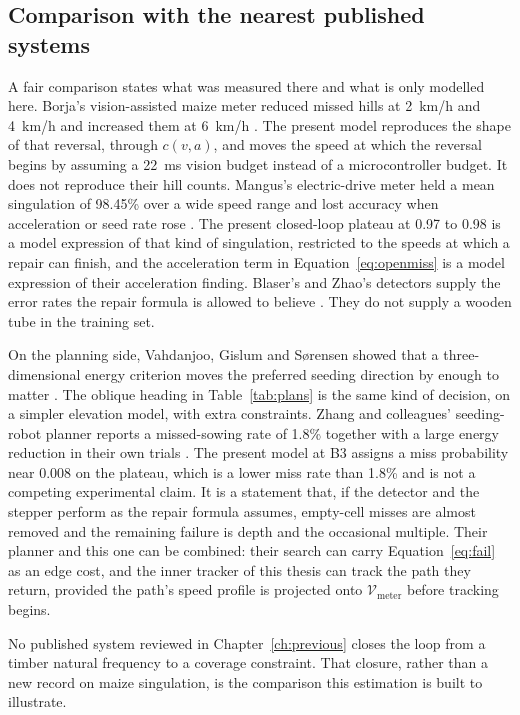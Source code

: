 \subsection{Comparison with the nearest published systems}

A fair comparison states what was measured there and what is only modelled here. Borja's vision-assisted maize meter reduced missed hills at \SI{2}{km/h} and \SI{4}{km/h} and increased them at \SI{6}{km/h} \cite{borja2021}. The present model reproduces the shape of that reversal, through \(c(v,a)\), and moves the speed at which the reversal begins by assuming a \SI{22}{ms} vision budget instead of a microcontroller budget. It does not reproduce their hill counts. Mangus's electric-drive meter held a mean singulation of \num{98.45}\% over a wide speed range and lost accuracy when acceleration or seed rate rose \cite{mangus2017}. The present closed-loop plateau at \num{0.97} to \num{0.98} is a model expression of that kind of singulation, restricted to the speeds at which a repair can finish, and the acceleration term in Equation~\eqref{eq:openmiss} is a model expression of their acceleration finding. Blaser's and Zhao's detectors supply the error rates the repair formula is allowed to believe \cite{blaser2024,zhao2025yolo}. They do not supply a wooden tube in the training set.

On the planning side, Vahdanjoo, Gislum and S{\o}rensen showed that a three-dimensional energy criterion moves the preferred seeding direction by enough to matter \cite{vahdanjoo2023}. The oblique heading in Table~\ref{tab:plans} is the same kind of decision, on a simpler elevation model, with extra constraints. Zhang and colleagues' seeding-robot planner reports a missed-sowing rate of \num{1.8}\% together with a large energy reduction in their own trials \cite{zhang2025path}. The present model at B3 assigns a miss probability near \num{0.008} on the plateau, which is a lower miss rate than \num{1.8}\% and is not a competing experimental claim. It is a statement that, if the detector and the stepper perform as the repair formula assumes, empty-cell misses are almost removed and the remaining failure is depth and the occasional multiple. Their planner and this one can be combined: their search can carry Equation~\eqref{eq:fail} as an edge cost, and the inner tracker of this thesis can track the path they return, provided the path's speed profile is projected onto \(\mathcal{V}_{\mathrm{meter}}\) before tracking begins.

No published system reviewed in Chapter~\ref{ch:previous} closes the loop from a timber natural frequency to a coverage constraint. That closure, rather than a new record on maize singulation, is the comparison this estimation is built to illustrate.

